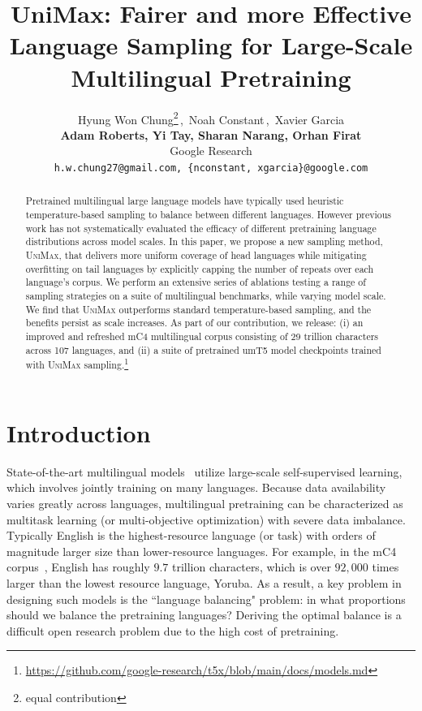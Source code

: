 \documentclass{article} %
\title{UniMax: Fairer and more Effective Language Sampling for Large-Scale Multilingual Pretraining}
\author{Hyung Won Chung\thanks{equal contribution}\,,~Noah Constant\footnotemark[1]\,,~Xavier Garcia\footnotemark[1] \\ \textbf{Adam Roberts, Yi Tay, Sharan Narang, Orhan Firat} \\
Google Research \\
\texttt{h.w.chung27@gmail.com, \{nconstant, xgarcia\}@google.com}
}
\newcommand{\unimax}{\textsc{UniMax}}
\begin{document}
\maketitle

\begin{abstract}
Pretrained multilingual large language models have typically used heuristic temperature-based sampling to balance between different languages. However previous work has not systematically evaluated the efficacy of different pretraining language distributions across model scales. In this paper, we propose a new sampling method, \unimax{}, that delivers more uniform coverage of head languages while mitigating overfitting on tail languages by explicitly capping the number of repeats over each language's corpus. We perform an extensive series of ablations testing a range of sampling strategies on a suite of multilingual benchmarks, while varying model scale. We find that \unimax{} outperforms standard temperature-based sampling, and the benefits persist as scale increases. As part of our contribution, we release: (i) an improved and refreshed mC4 multilingual corpus consisting of 29 trillion characters across 107 languages, and (ii) a suite of pretrained umT5 model checkpoints trained with \unimax{} sampling.\footnote{\url{https://github.com/google-research/t5x/blob/main/docs/models.md}}

\end{abstract}

\section{Introduction}

State-of-the-art multilingual models~\citep[][\textit{inter alia}]{xue-etal-2021-mt5,xue-etal-2022-byt5,goyal_xlmr_scaled} utilize large-scale self-supervised learning, which involves jointly training on many languages. Because data availability varies greatly across languages, multilingual pretraining can be characterized as multitask learning (or multi-objective optimization) with severe data imbalance. Typically English is the highest-resource language (or task) with orders of magnitude larger size than lower-resource languages. For example, in the mC4 corpus~\citep{xue-etal-2021-mt5}, English has roughly $9.7$ trillion characters, which is over $92{,}000$ times larger than the lowest resource language, Yoruba. As a result, a key problem in designing such models is the ``language balancing" problem: in what proportions should we balance the pretraining languages? Deriving the optimal balance is a difficult open research problem due to the high cost of pretraining.
\end{document}
